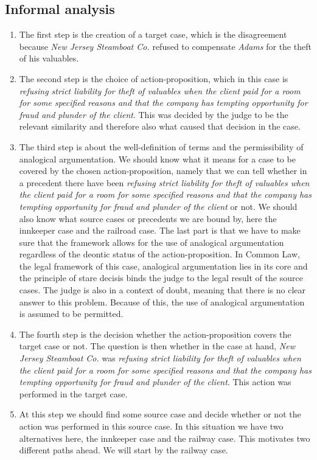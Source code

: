 		\subsection{Informal analysis}
			\begin{enumerate}
				\item The first step is the creation of a target case, which is the disagreement because \textit{New Jersey Steamboat Co.} refused to compensate \textit{Adams} for the theft of his valuables. 
				\item The second step is the choice of action-proposition, which in this case is \textit{refusing strict liability for theft of valuables when the client paid for a room for some specified reasons and that the company has tempting opportunity for fraud and plunder of the client}. This was decided by the judge to be the relevant similarity and therefore also what caused that decision in the case.
				\item The third step is about the well-definition of terms and the permissibility of analogical argumentation. We should know what it means for a case to be covered by the chosen action-proposition, namely that we can tell whether in a precedent there have been \textit{refusing strict liability for theft of valuables when the client paid for a room for some specified reasons and that the company has tempting opportunity for fraud and plunder of the client} or not. We should also know what source cases or precedents we are bound by, here the innkeeper case and the railroad case. The last part is that we have to make sure that the framework allows for the use of analogical argumentation regardless of the deontic status of the action-proposition. In Common Law, the legal framework of this case, analogical argumentation lies in its core and the principle of stare decisis binds the judge to the legal result of the source cases. The judge is also in a context of doubt, meaning that there is no clear answer to this problem. Because of this, the use of analogical argumentation is assumed to be permitted. 
				\item The fourth step is the decision whether the action-proposition covers the target case or not. The question is then whether in the case at hand, \textit{New Jersey Steamboat Co.} was \textit{refusing strict liability for theft of valuables when the client paid for a room for some specified reasons and that the company has tempting opportunity for fraud and plunder of the client}. This action was performed in the target case.
				\item At this step we should find some source case and decide whether or not the action was performed in this source case. In this situation we have two alternatives here, the innkeeper case and the railway case. This motivates two different paths ahead. We will start by the railway case.
			\end{enumerate}
			

